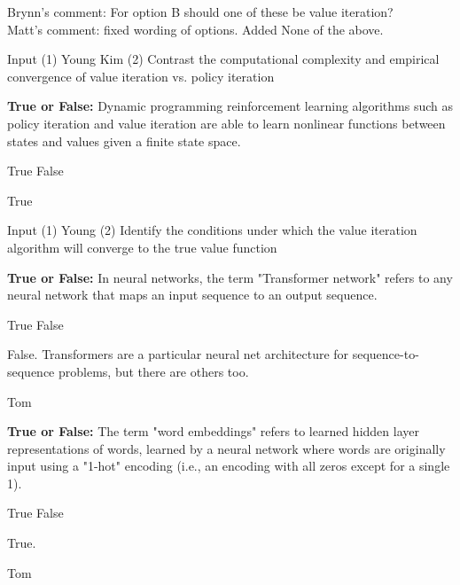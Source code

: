 \begin{questions}
\begin{soln}
    Brynn's comment: For option B should one of these be value iteration?\\
    Matt's comment: fixed wording of options. Added None of the above.
    \end{soln}
    \begin{qauthor}
    Input (1) Young Kim (2) Contrast the computational complexity and empirical convergence of value iteration vs. policy iteration
    \end{qauthor}
    

\question[1] \textbf{True or False:} Dynamic programming reinforcement learning algorithms such as policy iteration and value iteration are able to learn nonlinear functions between states and values given a finite state space.
    \begin{checkboxes}
     \choice True 
     \choice False
    \end{checkboxes}
    \begin{soln}
    True
    \end{soln}
    \begin{qauthor}
    Input (1) Young (2) Identify the conditions under which the value iteration algorithm will converge to the true value function
    \end{qauthor}
    
    
    
\question[1] \textbf{True or False:} In neural networks, the term "Transformer network" refers to any neural network that maps an input sequence to an output sequence.
    \begin{checkboxes}
     \choice True 
     \choice False
    \end{checkboxes}
    \begin{soln}
    False. Transformers are a particular neural net architecture for sequence-to-sequence problems, but there are others too.  \\
    \end{soln}
    \begin{qauthor}
    Tom
    \end{qauthor}    
    
    
\question[1] \textbf{True or False:} The term "word embeddings" refers to learned hidden layer representations of words, learned by a neural network where words are originally input using a "1-hot" encoding (i.e., an encoding with all zeros except for a single 1).
    \begin{checkboxes}
     \choice True 
     \choice False
    \end{checkboxes}
    \begin{soln}
    True.  \\
    \end{soln}
    \begin{qauthor}
    Tom
    \end{qauthor}


\end{questions}
